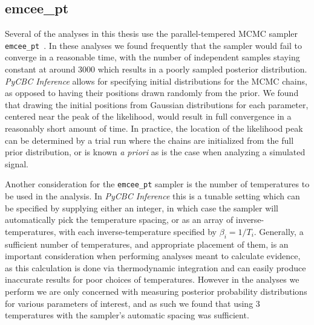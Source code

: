 \subsection{emcee\_pt}
Several of the analyses in this thesis use the parallel-tempered MCMC sampler \\ \texttt{emcee\_pt}~\cite{Foreman_Mackey_2013,Vousden_2015}. In these analyses we found frequently that the sampler would fail to converge in a reasonable time, with the number of independent samples staying constant at around 3000 which results in a poorly sampled posterior distribution. \textit{PyCBC Inference} allows for specifying initial distributions for the MCMC chains, as opposed to having their positions drawn randomly from the prior. We found that drawing the initial positions from Gaussian distributions for each parameter, centered near the peak of the likelihood, would result in full convergence in a reasonably short amount of time. In practice, the location of the likelihood peak can be determined by a trial run where the chains are initialized from the full prior distribution, or is known \textit{a priori} as is the case when analyzing a simulated signal.

Another consideration for the \texttt{emcee\_pt} sampler is the number of temperatures to be used in the analysis. In \textit{PyCBC Inference} this is a tunable setting which can be specified by supplying either an integer, in which case the sampler will automatically pick the temperature spacing, or as an array of inverse-temperatures, with each inverse-temperature specified by $\beta_i=1/T_i$. Generally, a sufficient number of temperatures, and appropriate placement of them, is an important consideration when performing analyses meant to calculate evidence, as this calculation is done via thermodynamic integration and can easily produce inaccurate results for poor choices of temperatures. However in the analyses we perform we are only concerned with measuring posterior probability distributions for various parameters of interest, and as such we found that using $3$ temperatures with the sampler's automatic spacing was sufficient.

